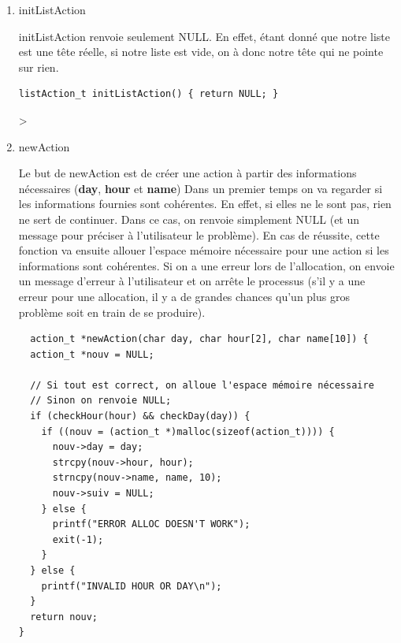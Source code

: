 \documentclass[11pt]{article}
\begin{document}
\begin{enumerate}
\item initListAction
\label{sec:orgb1259c3}

initListAction renvoie seulement NULL. En effet, étant donné que notre liste est une tête réelle, si notre liste est vide, on à donc notre tête qui ne pointe sur
rien.

\begin{lstlisting}
listAction_t initListAction() { return NULL; }
\end{lstlisting}
>


\item newAction
\label{sec:org0b2d499}

Le but de newAction est de créer une action à partir des informations
nécessaires
(\textbf{day}, \textbf{hour} et \textbf{name})
Dans un premier temps on va regarder si les informations fournies sont
cohérentes. En effet, si elles ne le sont pas, rien ne sert de continuer. Dans ce cas, on renvoie simplement NULL (et un message pour préciser à l'utilisateur le
problème).
En cas de réussite, cette fonction va ensuite allouer l'espace mémoire nécessaire pour une action si les informations sont cohérentes. Si on a une erreur lors de
l'allocation, on envoie un message d'erreur à l'utilisateur et on arrête le
processus (s'il y a une erreur pour une allocation, il y a de grandes
chances qu'un plus gros problème soit en train de se produire).

\begin{lstlisting}
  action_t *newAction(char day, char hour[2], char name[10]) {
  action_t *nouv = NULL;

  // Si tout est correct, on alloue l'espace mémoire nécessaire
  // Sinon on renvoie NULL;
  if (checkHour(hour) && checkDay(day)) {
    if ((nouv = (action_t *)malloc(sizeof(action_t)))) {
      nouv->day = day;
      strcpy(nouv->hour, hour);
      strncpy(nouv->name, name, 10);
      nouv->suiv = NULL;
    } else {
      printf("ERROR ALLOC DOESN'T WORK");
      exit(-1);
    }
  } else {
    printf("INVALID HOUR OR DAY\n");
  }
  return nouv;
}
\end{lstlisting}



\end{enumerate}
\end{document}
